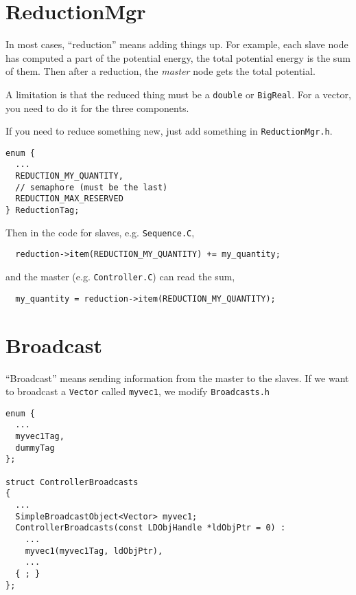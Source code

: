 \documentclass{article}
\begin{document}

\section{\label{sec:reduction}ReductionMgr}

In most cases,
``reduction'' means adding things up.
%
For example, each slave node has computed
a part of the potential energy,
the total potential energy is the sum of them.
%
Then after a reduction,
the \emph{master} node gets the total potential.

A limitation is that the reduced thing
must be a \texttt{double} or \texttt{BigReal}.
%
For a vector, you need to do it for the three components.
%

If you need to reduce something new,
just add something in \texttt{ReductionMgr.h}.
\begin{lstlisting}
enum {
  ...
  REDUCTION_MY_QUANTITY,
  // semaphore (must be the last)
  REDUCTION_MAX_RESERVED
} ReductionTag;
\end{lstlisting}
%
Then in the code for slaves, e.g. \texttt{Sequence.C},
%
\begin{lstlisting}
  reduction->item(REDUCTION_MY_QUANTITY) += my_quantity;
\end{lstlisting}
%
and the master (e.g. \texttt{Controller.C}) can read the sum,
%
\begin{lstlisting}
  my_quantity = reduction->item(REDUCTION_MY_QUANTITY);
\end{lstlisting}


\section{\label{sec:broadcast}Broadcast}

``Broadcast'' means sending information from the master
to the slaves.
%
If we want to broadcast a \texttt{Vector} called \texttt{myvec1},
we modify \texttt{Broadcasts.h}
%
\begin{lstlisting}
enum {
  ...
  myvec1Tag,
  dummyTag
};

struct ControllerBroadcasts
{
  ...
  SimpleBroadcastObject<Vector> myvec1;
  ControllerBroadcasts(const LDObjHandle *ldObjPtr = 0) :
    ...
    myvec1(myvec1Tag, ldObjPtr),
    ...
  { ; }
};
\end{lstlisting}
\end{document}
